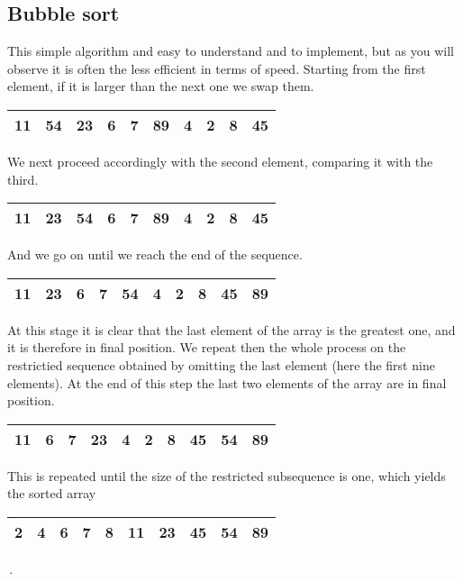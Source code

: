 \documentclass[a4paper,12pt]{article}
\begin{document}
\subsection{Bubble sort}
\label{sec:bulle}
This simple algorithm and easy to understand and to implement, but as you will observe it is often the less efficient in terms of speed. Starting from the first element, if it is larger than the next one we swap them.
\begin{center}
  \begin{tabular}{|c|c|c|c|c|c|c|c|c|c|}
    \hline 11 & 54 & 23 & 6 & 7 & 89 & 4 & 2 & 8 & 45 \\ \hline
  \end{tabular}
\end{center}
We next proceed accordingly with the second element, comparing it with the third.
\begin{center}
  \begin{tabular}{|c|c|c|c|c|c|c|c|c|c|}
    \hline 11 & 23 & 54 & 6 & 7 & 89 & 4 & 2 & 8 & 45 \\ \hline
  \end{tabular}
\end{center}
And we go on until we reach the end of the sequence.
\begin{center}
  \begin{tabular}{|c|c|c|c|c|c|c|c|c|c|}
    \hline 11 & 23 & 6 & 7 & 54 & 4 & 2 & 8 & 45 & 89 \\ \hline
  \end{tabular}
\end{center}
At this stage it is clear that the last element of the array is the greatest one, and it is therefore in final position. We repeat then the whole process on the restrictied sequence obtained by omitting the last element (here the first nine elements). At the end of this step the last two elements of the array are in final position.
\begin{center}
  \begin{tabular}{|c|c|c|c|c|c|c|c|c|c|}
    \hline 11 & 6 & 7 & 23 & 4 & 2 & 8 & 45 & 54 & 89 \\ \hline
  \end{tabular}
\end{center}
This is repeated until the size of the restricted subsequence is one, which yields the sorted array
\begin{center}
  \begin{tabular}{|c|c|c|c|c|c|c|c|c|c|}
    \hline 2 & 4 & 6 & 7 & 8 & 11 & 23 & 45 & 54 & 89 \\ \hline
  \end{tabular}\,.
\end{center}
\end{document}
